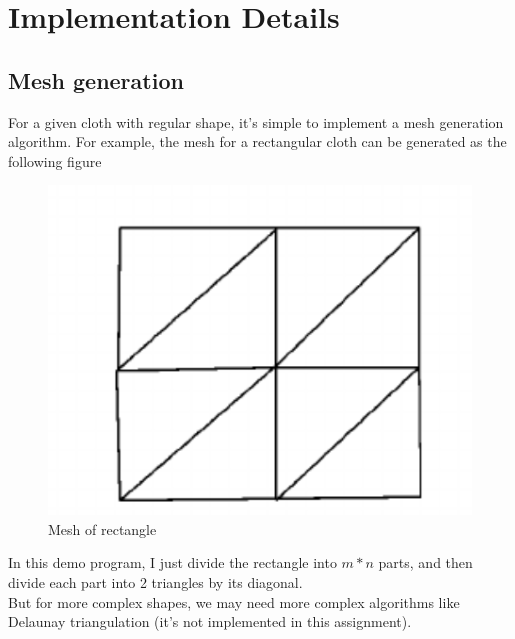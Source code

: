 \documentclass[acmtog]{acmart}
\begin{document}
\section{Implementation Details}
\subsection{Mesh generation}
For a given cloth with regular shape, it's simple to implement a mesh generation algorithm.
For example, the mesh for a rectangular cloth can be generated as the following figure
\begin{figure}[H]
	\centering
	\includegraphics[scale=0.5]{./mesh.png}
	\caption{Mesh of rectangle}
\end{figure}
In this demo program, I just divide the rectangle into $m*n$ parts, and then divide each 
part into 2 triangles by its diagonal.\\
But for more complex shapes, we may need more complex algorithms like Delaunay triangulation
(it's not implemented in this assignment).\\
\end{document}
